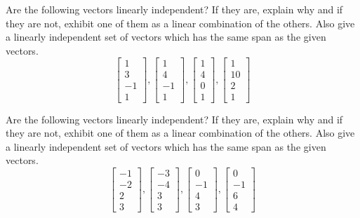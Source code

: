 \documentclass{ximera}
\begin{document}
\begin{problem}\label{prb:3.15} Are the following vectors linearly independent? If they are, explain
why and if they are not, exhibit one of them as a linear combination of the
others. Also give a linearly independent set of vectors which has the same
span as the given vectors.
\begin{equation*}
\left[
\begin{array}{r}
1 \\
3 \\
-1 \\
1
\end{array}
\right] ,\left[
\begin{array}{r}
1 \\
4 \\
-1 \\
1
\end{array}
\right] ,\left[
\begin{array}{r}
1 \\
4 \\
0 \\
1
\end{array}
\right] ,\left[
\begin{array}{r}
1 \\
10 \\
2 \\
1
\end{array}
\right]
\end{equation*}
\end{problem}

\begin{problem}\label{prb:3.16} Are the following vectors linearly independent? If they are, explain
why and if they are not, exhibit one of them as a linear combination of the
others. Also give a linearly independent set of vectors which has the same
span as the given vectors.
\begin{equation*}
\left[
\begin{array}{r}
-1 \\
-2 \\
2 \\
3
\end{array}
\right] ,\left[
\begin{array}{r}
-3 \\
-4 \\
3 \\
3
\end{array}
\right] ,\left[
\begin{array}{r}
0 \\
-1 \\
4 \\
3
\end{array}
\right] ,\left[
\begin{array}{r}
0 \\
-1 \\
6 \\
4
\end{array}
\right]
\end{equation*}
\end{problem}
\end{document}
